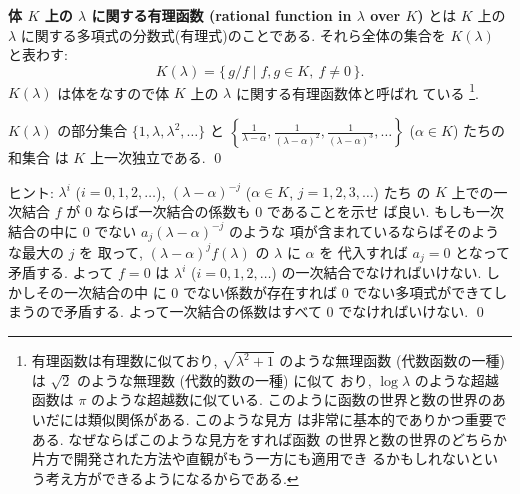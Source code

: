 \documentclass[12pt,twoside]{jarticle}
\begin{document}

{\bf 体 $K$ 上の $\lambda$ に関する有理函数 (rational function in $\lambda$
over $K$)} とは $K$ 上の $\lambda$ に関する多項式の分数式(有理式)のことである. 
それら全体の集合を $K(\lambda)$ と表わす:
\begin{equation*}
  K(\lambda) = \{\, g/f \mid f,g\in K,\ f\ne 0 \,\}.
\end{equation*}
$K(\lambda)$ は体をなすので体 $K$ 上の $\lambda$ に関する有理函数体と呼ばれ
ている%
\footnote{有理函数は有理数に似ており, $\sqrt{\lambda^2+1}$ のような無理函数
  (代数函数の一種) は $\sqrt{2}$ のような無理数 (代数的数の一種) に似て
  おり, $\log\lambda$ のような超越函数は $\pi$ のような超越数に似ている.  
  このように函数の世界と数の世界のあいだには類似関係がある.  このような見方
  は非常に基本的でありかつ重要である.  なぜならばこのような見方をすれば函数
  の世界と数の世界のどちらか片方で開発された方法や直観がもう一方にも適用でき
  るかもしれないという考え方ができるようになるからである.}.


\begin{question}
\label{q:partial-fraction-1}
  $K(\lambda)$ の部分集合 $\{1,\lambda,\lambda^2,\ldots\}$ 
  と $\left\{\frac{1}{\lambda-\alpha}, \frac{1}{(\lambda-\alpha)^2}, 
    \frac{1}{(\lambda-\alpha)^3},\ldots\right\}$ ($\alpha\in K$) たちの和集合
  は $K$ 上一次独立である. \qed
\end{question}

\noindent
ヒント: $\lambda^i$ ($i=0,1,2,\dots$), 
$(\lambda-\alpha)^{-j}$ ($\alpha\in K$, $j=1,2,3,\dots$) たち
の $K$ 上での一次結合 $f$ が $0$ ならば一次結合の係数も $0$ であることを示せ
ば良い.  もしも一次結合の中に $0$ でない $a_j(\lambda-\alpha)^{-j}$ のような
項が含まれているならばそのような最大の $j$ を
取って, $(\lambda-\alpha)^jf(\lambda)$ の $\lambda$ に $\alpha$ を
代入すれば $a_j=0$ となって矛盾する.  よって $f=0$ は $\lambda^i$
($i=0,1,2,\dots$) の一次結合でなければいけない.  しかしその一次結合の中
に $0$ でない係数が存在すれば $0$ でない多項式ができてしまうので矛盾する. 
よって一次結合の係数はすべて $0$ でなければいけない.
\qed

\end{document}
